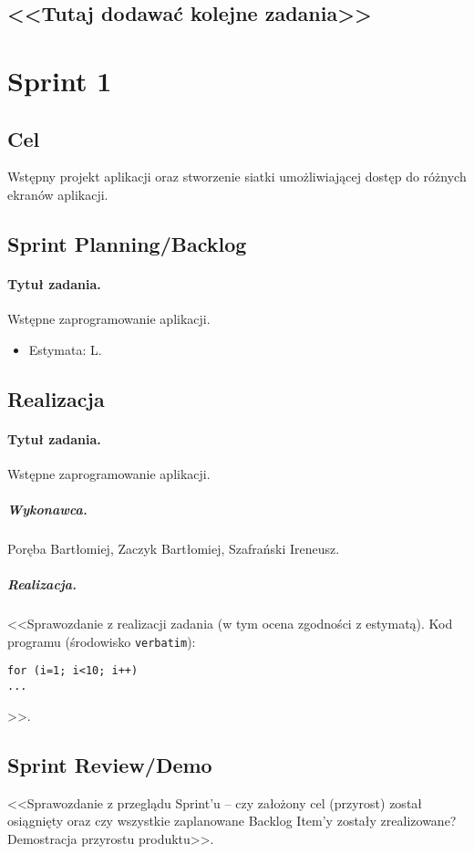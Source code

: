 \documentclass[a4paper]{article}
\begin{document}
\subsection*{<<Tutaj dodawać kolejne zadania>>}

\section{Sprint 1}
\subsection{Cel} Wstępny projekt aplikacji oraz stworzenie siatki umożliwiającej dostęp do różnych ekranów aplikacji.
\subsection{Sprint Planning/Backlog}

\paragraph{Tytuł zadania.} Wstępne zaprogramowanie aplikacji.
\begin{itemize}
	\item Estymata: L.
\end{itemize}


\subsection{Realizacja}

\paragraph{Tytuł zadania.} Wstępne zaprogramowanie aplikacji.
\subparagraph{Wykonawca.} Poręba Bartłomiej, Zaczyk Bartłomiej, Szafrański Ireneusz.
\subparagraph{Realizacja.} <<Sprawozdanie z realizacji zadania (w tym ocena zgodności z estymatą). Kod programu (środowisko \texttt{verbatim}): \begin{verbatim}
for (i=1; i<10; i++)
...
\end{verbatim}>>.


\subsection{Sprint Review/Demo}
<<Sprawozdanie z przeglądu Sprint'u -- czy założony cel (przyrost) został osiągnięty oraz czy wszystkie zaplanowane Backlog Item'y zostały zrealizowane? Demostracja przyrostu produktu>>.
\end{document}
